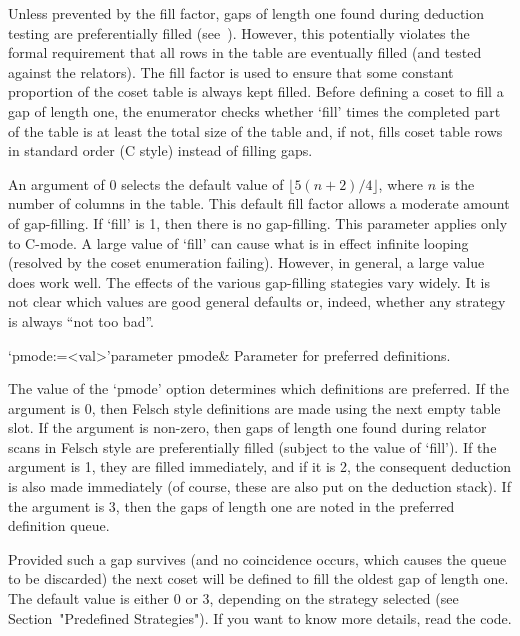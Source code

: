 Unless prevented by  the fill factor, gaps of  length one found during
deduction  testing  are   preferentially  filled  (see~\cite{Hav}).
However,  this potentially  violates the  formal requirement  that all
rows  in the  table  are  eventually filled  (and  tested against  the
relators).   The fill  factor is  used  to ensure  that some  constant
proportion of the coset table  is always kept filled.  Before defining
a coset  to fill a  gap of length  one, the enumerator  checks whether
`fill' times  the completed part  of the table  is at least  the total
size of  the table  and, if  not, fills coset  table rows  in standard
order (C style) instead of filling gaps.

An  argument of  0  selects  the default  value  of $\lfloor  5(n+2)/4
\rfloor$,  where $n$  is the  number of  columns in  the  table.  This
default  fill factor  allows  a moderate  amount  of gap-filling.   If
`fill' is  1, then  there is no  gap-filling.  This  parameter applies
only to C-mode.   A large value of `fill' can cause  what is in effect
infinite  looping   (resolved  by  the   coset  enumeration  failing).
However, in general, a large value does work well.  The effects of the
various  gap-filling stategies  vary widely.   It is  not  clear which
values are good  general defaults or, indeed, whether  any strategy is
always ``not too bad''.


\>`pmode:=<val>'{parameter pmode}&
Parameter for preferred definitions.

The  value of  the  `pmode' option  determines  which definitions  are
preferred.  If  the argument is  0, then Felsch style  definitions are
made using  the next empty table  slot.  If the  argument is non-zero,
then gaps of length one found during relator scans in Felsch style are
preferentially  filled  (subject to  the  value  of  `fill').  If  the
argument  is 1,  they are  filled  immediately, and  if it  is 2,  the
consequent deduction  is also made  immediately (of course,  these are
also put on the deduction stack).  If the argument is 3, then the gaps
of length one are noted in the preferred definition queue.

Provided such a gap survives  (and no coincidence occurs, which causes
the queue to be discarded) the  next coset will be defined to fill the
oldest  gap of  length  one.  The  default  value is  either  0 or  3,
depending       on        the       strategy       selected       (see
Section~"Predefined Strategies").  If you  want to  know  more details,
read the code.


